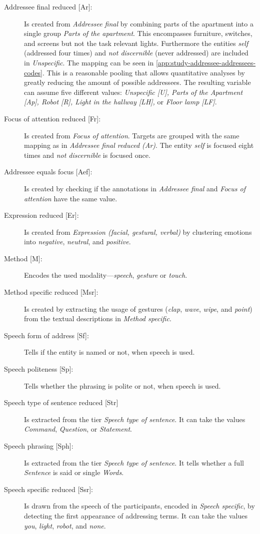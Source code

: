 \begin{description}
    \item[{Addressee final reduced [Ar]:}] Is created from \emph{Addressee final} by combining parts of the \gls{apartment} into a single group \emph{Parts of the apartment}.
    This encompasses furniture, switches, and screens but not the task relevant lights.
    Furthermore the entities \emph{self} (addressed four times) and \emph{not discernible} (never addressed) are included in \emph{Unspecific}.
    The mapping can be seen in \cref{app:study-addressee-addressees-codes}.
    This is a reasonable pooling that allows quantitative analyses by greatly reducing the amount of possible \glspl{addressee}.
    The resulting variable can assume five different values: \emph{Unspecific [U], Parts of the Apartment [Ap], Robot [R], Light in the hallway [LH], } or \emph{Floor lamp [LF]}.
    \item[{Focus of attention reduced [Fr]:}] Is created from \emph{Focus of attention}.
    Targets are grouped with the same mapping as in \emph{Addressee final reduced (Ar)}. 
    The entity \emph{self} is focused eight times and \emph{not discernible} is focused once.
    \item[{Addressee equals focus [Aef]:}] Is created by checking if the annotations in \emph{Addressee final} and \emph{Focus of attention} have the same value.
    \item[{Expression reduced [Er]:}] Is created from \emph{Expression (facial, gestural, verbal)} by clustering emotions into \emph{negative}, \emph{neutral}, and \emph{positive}.
    \item[{Method [M]:}] Encodes the used modality---\emph{speech}, \emph{gesture} or \emph{touch}.
    \item[{Method specific reduced [Msr]:}] Is created by extracting the usage of gestures (\emph{clap}, \emph{wave}, \emph{wipe}, and \emph{point}) from the textual descriptions in \emph{Method specific}.
    \item[{Speech form of address [Sf]:}] Tells if the entity is named or not, when speech is used.
    \item[{Speech politeness [Sp]:}] Tells whether the phrasing is polite or not, when speech is used.
    \item[{Speech type of sentence reduced [Str]}] Is extracted from the tier \emph{Speech type of sentence}.
    It can take the values \emph{Command}, \emph{Question}, or \emph{Statement}. 
    \item[{Speech phrasing [Sph]:}] Is extracted from the tier \emph{Speech type of sentence}.
    It tells whether a full \emph{Sentence} is said or single \emph{Words}.
    \item[{Speech specific reduced [Ssr]:}] Is drawn from the speech of the participants, encoded in \emph{Speech specific}, by detecting the first appearance of addressing terms.
    It can take the values \emph{you}, \emph{light}, \emph{robot}, and \emph{none}.
\end{description}

